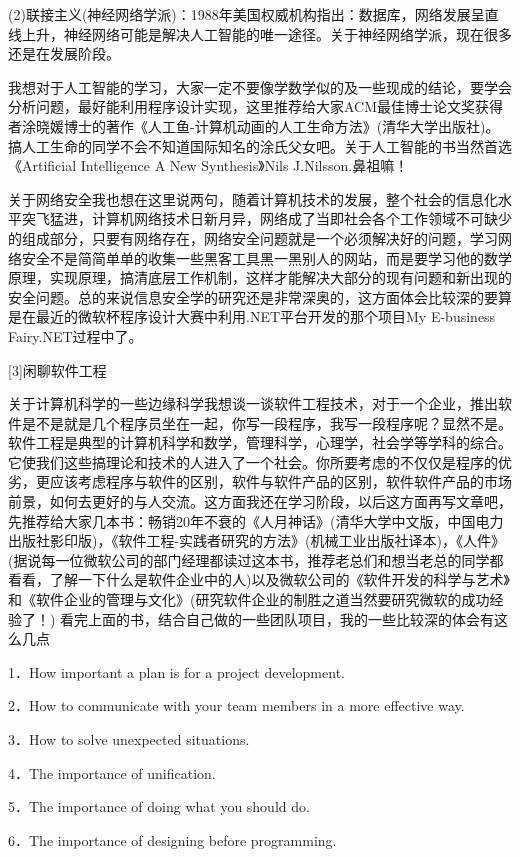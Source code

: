 (2)联接主义(神经网络学派)：1988年美国权威机构指出：数据库，网络发展呈直线上升，神经网络可能是解决人工智能的唯一途径。关于神经网络学派，现在很多还是在发展阶段。 

我想对于人工智能的学习，大家一定不要像学数学似的及一些现成的结论，要学会分析问题，最好能利用程序设计实现，这里推荐给大家ACM最佳博士论文奖获得者涂晓媛博士的著作《人工鱼-计算机动画的人工生命方法》(清华大学出版社)。搞人工生命的同学不会不知道国际知名的涂氏父女吧。关于人工智能的书当然首选《Artificial Intelligence A New Synthesis》Nils J.Nilsson.鼻祖嘛！ 

关于网络安全我也想在这里说两句，随着计算机技术的发展，整个社会的信息化水平突飞猛进，计算机网络技术日新月异，网络成了当即社会各个工作领域不可缺少的组成部分，只要有网络存在，网络安全问题就是一个必须解决好的问题，学习网络安全不是简简单单的收集一些黑客工具黑一黑别人的网站，而是要学习他的数学原理，实现原理，搞清底层工作机制，这样才能解决大部分的现有问题和新出现的安全问题。总的来说信息安全学的研究还是非常深奥的，这方面体会比较深的要算是在最近的微软杯程序设计大赛中利用.NET平台开发的那个项目My E-business Fairy.NET过程中了。 

[3]闲聊软件工程 

关于计算机科学的一些边缘科学我想谈一谈软件工程技术，对于一个企业，推出软件是不是就是几个程序员坐在一起，你写一段程序，我写一段程序呢？显然不是。软件工程是典型的计算机科学和数学，管理科学，心理学，社会学等学科的综合。它使我们这些搞理论和技术的人进入了一个社会。你所要考虑的不仅仅是程序的优劣，更应该考虑程序与软件的区别，软件与软件产品的区别，软件软件产品的市场前景，如何去更好的与人交流。这方面我还在学习阶段，以后这方面再写文章吧，先推荐给大家几本书：畅销20年不衰的《人月神话》(清华大学中文版，中国电力出版社影印版)，《软件工程-实践者研究的方法》(机械工业出版社译本)，《人件》(据说每一位微软公司的部门经理都读过这本书，推荐老总们和想当老总的同学都看看，了解一下什么是软件企业中的人)以及微软公司的《软件开发的科学与艺术》和《软件企业的管理与文化》(研究软件企业的制胜之道当然要研究微软的成功经验了！) 看完上面的书，结合自己做的一些团队项目，我的一些比较深的体会有这么几点 

1．How important a plan is for a project development. 

2．How to communicate with your team members in a more effective way. 

3．How to solve unexpected situations. 

4．The importance of unification. 

5．The importance of doing what you should do. 

6．The importance of designing before programming. 

